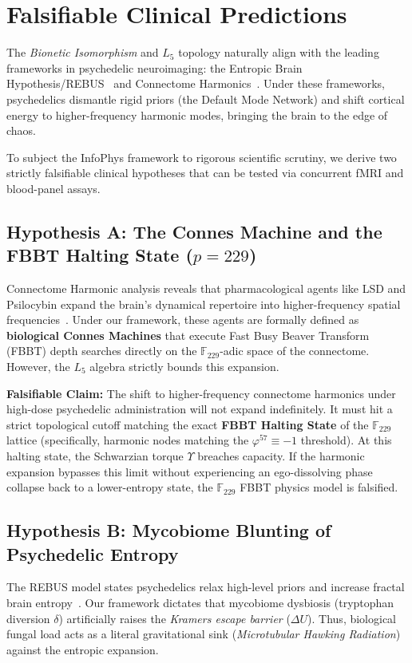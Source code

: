 \section{Falsifiable Clinical Predictions}

The \emph{Bionetic Isomorphism} and $L_5$ topology naturally align with the leading frameworks in psychedelic neuroimaging: the Entropic Brain Hypothesis/REBUS~\cite{carhart2019} and Connectome Harmonics~\cite{atasoy2017}. Under these frameworks, psychedelics dismantle rigid priors (the Default Mode Network) and shift cortical energy to higher-frequency harmonic modes, bringing the brain to the edge of chaos.

To subject the InfoPhys framework to rigorous scientific scrutiny, we derive two strictly falsifiable clinical hypotheses that can be tested via concurrent fMRI and blood-panel assays.

\subsection{Hypothesis A: The Connes Machine and the FBBT Halting State (\texorpdfstring{$p=229$}{p=229})}
Connectome Harmonic analysis reveals that pharmacological agents like LSD and Psilocybin expand the brain's dynamical repertoire into higher-frequency spatial frequencies~\cite{atasoy2017}. Under our framework, these agents are formally defined as \textbf{biological Connes Machines} that execute Fast Busy Beaver Transform (FBBT) depth searches directly on the $\mathbb{F}_{229}$-adic space of the connectome. However, the $L_5$ algebra strictly bounds this expansion.

\textbf{Falsifiable Claim:} The shift to higher-frequency connectome harmonics under high-dose psychedelic administration will not expand indefinitely. It must hit a strict topological cutoff matching the exact \textbf{FBBT Halting State} of the $\mathbb{F}_{229}$ lattice (specifically, harmonic nodes matching the $\varphi^{57} \equiv -1$ threshold). At this halting state, the Schwarzian torque $\Upsilon$ breaches capacity. If the harmonic expansion bypasses this limit without experiencing an ego-dissolving phase collapse back to a lower-entropy state, the $\mathbb{F}_{229}$ FBBT physics model is falsified.

\subsection{Hypothesis B: Mycobiome Blunting of Psychedelic Entropy}
The REBUS model states psychedelics relax high-level priors and increase fractal brain entropy~\cite{carhart2019}. Our framework dictates that mycobiome dysbiosis (tryptophan diversion $\delta$) artificially raises the \emph{Kramers escape barrier} ($\Delta U$). Thus, biological fungal load acts as a literal gravitational sink (\emph{Microtubular Hawking Radiation}) against the entropic expansion.

